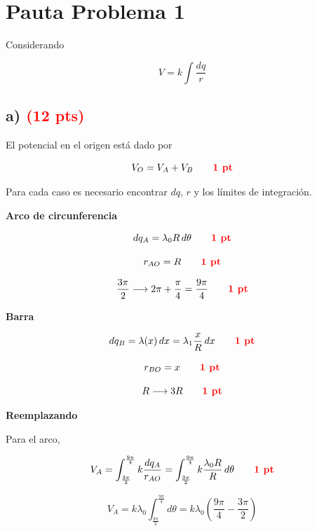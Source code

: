\documentclass[12pt]{article}
\begin{document}

\section*{Pauta Problema 1}

Considerando

\[
V=k\int\frac{dq}{r}
\]

\subsection*{a) \hfill \textcolor{red}{\textbf{(12 pts)}}}

El potencial en el origen está dado por

\[
V_O=V_A+V_B
\qquad
\textcolor{red}{\textbf{1 pt}}
\]

Para cada caso es necesario encontrar $dq$, $r$ y los límites de integración.

\vspace{0.3cm}

\textbf{Arco de circunferencia}

\[
dq_A=\lambda_0R\,d\theta
\qquad
\textcolor{red}{\textbf{1 pt}}
\]

\[
r_{AO}=R
\qquad
\textcolor{red}{\textbf{1 pt}}
\]

\[
\frac{3\pi}{2}
\longrightarrow
2\pi+\frac{\pi}{4}
=
\frac{9\pi}{4}
\qquad
\textcolor{red}{\textbf{1 pt}}
\]

\vspace{0.3cm}

\textbf{Barra}

\[
dq_B
=
\lambda(x)\,dx
=
\lambda_1\frac{x}{R}\,dx
\qquad
\textcolor{red}{\textbf{1 pt}}
\]

\[
r_{BO}=x
\qquad
\textcolor{red}{\textbf{1 pt}}
\]

\[
R\longrightarrow3R
\qquad
\textcolor{red}{\textbf{1 pt}}
\]

\vspace{0.4cm}

\textbf{Reemplazando}

Para el arco,

\[
V_A
=
\int_{\frac{3\pi}{2}}^{\frac{9\pi}{4}}
k\frac{dq_A}{r_{AO}}
=
\int_{\frac{3\pi}{2}}^{\frac{9\pi}{4}}
k\frac{\lambda_0R}{R}\,d\theta
\qquad
\textcolor{red}{\textbf{1 pt}}
\]

\[
V_A
=
k\lambda_0
\int_{\frac{3\pi}{2}}^{\frac{9\pi}{4}}
d\theta
=
k\lambda_0
\left(
\frac{9\pi}{4}-\frac{3\pi}{2}
\right)
\]
\end{document}

